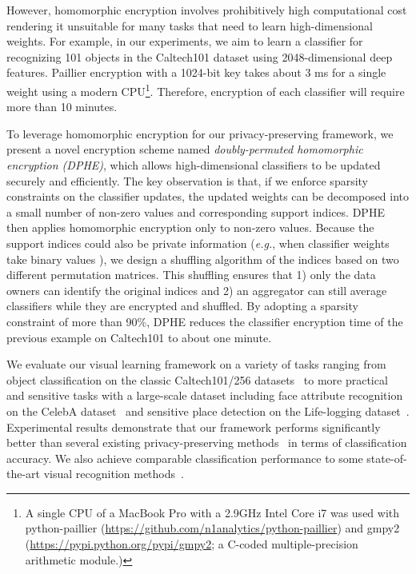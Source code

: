 \documentclass[10pt,twocolumn,letterpaper]{article}
\def\eg{{\it e.g.}}
\begin{document}
However, homomorphic encryption involves prohibitively high computational cost rendering it unsuitable for many tasks that need to learn high-dimensional weights. For example, in our experiments, we aim to learn a classifier for recognizing 101 objects in the Caltech101 dataset \cite{Fei-Fei2007a} using 2048-dimensional deep features. Paillier encryption with a 1024-bit key takes about 3 ms for a single weight using a modern CPU\footnote{A single CPU of a MacBook Pro with a 2.9GHz Intel Core i7 was used with python-paillier (\url{https://github.com/n1analytics/python-paillier}) and gmpy2 (\url{https://pypi.python.org/pypi/gmpy2}; a C-coded multiple-precision arithmetic module.)}. Therefore, encryption of each classifier will require more than 10 minutes.

To leverage homomorphic encryption for our privacy-preserving framework, we present a novel encryption scheme named \emph{doubly-permuted homomorphic encryption (DPHE)}, which allows high-dimensional classifiers to be updated securely and efficiently. The key observation is that, if we enforce sparsity constraints on the classifier updates, the updated weights can be decomposed into a small number of non-zero values and corresponding support indices. DPHE then applies homomorphic encryption only to non-zero values. Because the support indices could also be private information (\eg, when classifier weights take binary values \cite{Cheng2014a,Courbariaux2015a,Hare2012a}), we design a shuffling algorithm of the indices based on two different permutation matrices. This shuffling ensures that 1) only the data owners can identify the original indices and 2) an aggregator can still average classifiers while they are encrypted and shuffled. By adopting a sparsity constraint of more than 90\%, DPHE reduces the classifier encryption time of the previous example on Caltech101 to about one minute.

We evaluate our visual learning framework on a variety of tasks ranging from object classification on the classic Caltech101/256 datasets~\cite{Fei-Fei2007a,Griffin2007a} to more practical and sensitive tasks with a large-scale dataset including face attribute recognition on the CelebA dataset~\cite{Liu2015a} and sensitive place detection on the Life-logging dataset~\cite{Fan2016a}. Experimental results demonstrate that our framework performs significantly better than several existing privacy-preserving methods~\cite{Pathak2010a,Rajkumar2012a} in terms of classification accuracy. We also achieve comparable classification performance to some state-of-the-art visual recognition methods~\cite{He2015a,Liu2015a,Zeiler2014a}.
\end{document}
